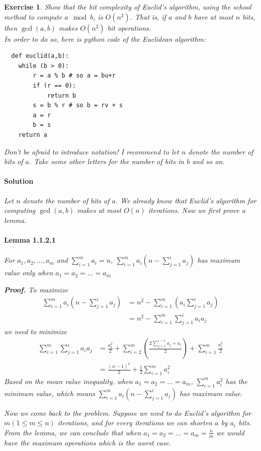 \documentclass[12pt,a4]{article}
\newtheorem{exercise}[theorem]{Exercise}
\begin{document}
\begin{exercise}
  Show that the bit complexity of Euclid's algorithm, using the school method
  to compute $a \mod b$, is $O(n^2)$. That is,
  if $a$ and $b$ have at most $n$ bits, then $\gcd(a,b)$ makes $O(n^2)$ bit operations.\\
  
  In order to do so, here is python code of the Euclidean algorithm:
\begin{verbatim}
  def euclid(a,b):
    while (b > 0):
        r = a % b # so a = bu+r
        if (r == 0):
            return b
        s = b % r # so b = rv + s
        a = r
        b = s
    return a
\end{verbatim}
Don't be afraid to introduce notation! I recommend to let $n$ denote the number of bits of $a$.
Take some other letters for the number of bits in $b$ and so on.

\paragraph{Solution}

Let $n$ denote the number of bits of $a$. We already know that Euclid's algorithm 
for computing $\gcd(a,b)$ makes at most $O(n)$ iterations.
Now we first prove a lemma.
\paragraph{Lemma 1.1.2.1}
For $a_1, a_2, \ldots, a_m$ and $\sum_{i=1}^m a_i = n$, $\sum_{i=1}^{m} a_i(n-\sum_{j=1}^i a_j)$ has maximum value only when $a_1 = a_2 =\ldots = a_m$

\textbf{Proof.} To maximize
\begin{align*}
  \sum_{i=1}^{m} a_i(n-\sum_{j=1}^i a_j) &= n^2 - \sum_{i=1}^m(a_i\sum_{j=1}^i a_j)\\
  &= n^2 - \sum_{i=1}^m \sum_{j=1}^i a_i a_j 
\end{align*}
we need to minimize 
\begin{align*}
  \sum_{i=1}^m \sum_{j=1}^i a_i a_j &= \frac{a_1^2}{2} + \sum_{i=2}^m(\frac{2\sum_{j=1}^{i-1} a_j + a_i}{2}) + \sum_{i=1}^m \frac{a_i^2}{2} \\
  &= \frac{(n-1)^2}{2} + \frac{1}{2} \sum_{i=1}^m a_i^2
\end{align*}
Based on the mean value inequality, when $a_1 = a_2 =\ldots =a_m$, $\sum_{i=1}^m a_i^2$ has the minimum value, which means $\sum_{i=1}^{m} a_i(n-\sum_{j=1}^i a_j)$ has maximum value.

Now we come back to the problem. Suppose we need to do Euclid's algorithm for $m (1\leq m\leq n)$ iterations, and for every iterations we can shorten $a$ by $a_i$ bits. From the lemma, we can conclude that when $a_1 = a_2 = \ldots = a_m = \frac{n}{m}$ we would have the maximum operations which is the worst case.


\end{exercise}
\end{document}
